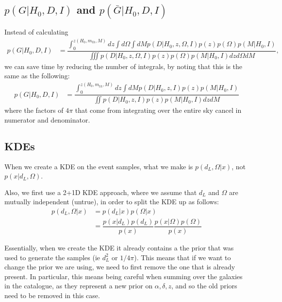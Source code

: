 \documentclass[a4paper,10pt]{article}
\begin{document}
\subsection{$p(G|H_0,D,I)$ and $p(\bar{G}|H_0,D,I)$}
Instead of calculating 
\begin{equation}
\begin{aligned}
p(G|H_0,D,I) &= \dfrac{\int^{z(H_0,m_{th},M)}_0 dz \int d\Omega \int dM p(D|H_0,z,\Omega,I) p(z)p(\Omega)p(M|H_0,I)}{\iiint p(D|H_0,z,\Omega,I) p(z)p(\Omega)p(M|H_0,I) dz d\Omega dM},
\end{aligned}
\end{equation}
we can save time by reducing the number of integrals, by noting that this is the same as the following:
\begin{equation}
\begin{aligned}
p(G|H_0,D,I) &= \dfrac{\int^{z(H_0,m_{th},M)}_0 dz \int dM p(D|H_0,z,I) p(z)p(M|H_0,I)}{\iint p(D|H_0,z,I) p(z)p(M|H_0,I) dz dM}
\end{aligned}
\end{equation}
where the factors of $4\pi$ that come from integrating over the entire sky cancel in numerator and denominator.




\subsection{KDEs}
When we create a KDE on the event samples, what we make is $p(d_L,\Omega|x)$, not $p(x|d_L,\Omega)$.

Also, we first use a 2+1D KDE approach, where we assume that $d_L$ and $\Omega$ are mutually independent (untrue), in order to split the KDE up as follows:
\begin{equation}
\begin{aligned}
p(d_L,\Omega|x) &= p(d_L|x) p(\Omega|x)
\\ &= \dfrac{p(x|d_L) p(d_L)}{p(x)} \dfrac{p(x|\Omega) p(\Omega)}{p(x)}
\end{aligned}
\end{equation}

Essentially, when we create the KDE it already contains a the prior that was used to generate the samples (ie $d_L^2$ or $1/4\pi$).  This means that if we want to change the prior we are using, we need to first remove the one that is already present.  In particular, this means being careful when summing over the galaxies in the catalogue, as they represent a new prior on $\alpha,\delta,z$, and so the old priors need to be removed in this case.
\end{document}
